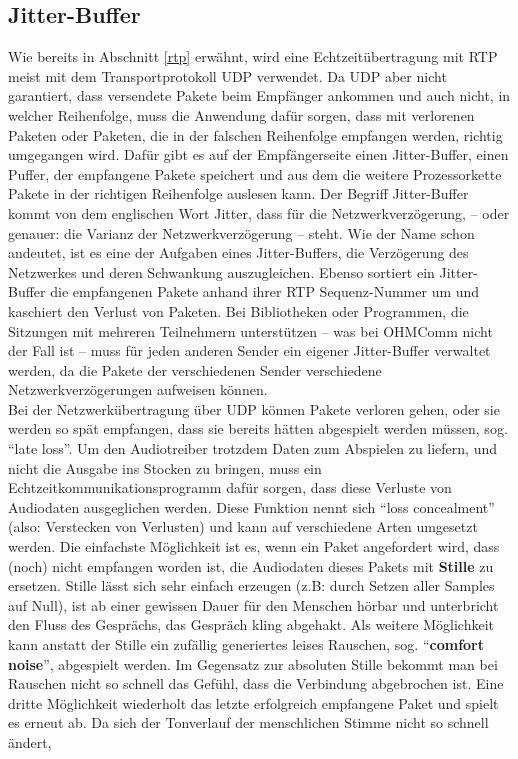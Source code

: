 \subsection{Jitter-Buffer}
\label{jitterBuffer}
Wie bereits in Abschnitt \ref{rtp} erwähnt, wird eine Echtzeitübertragung mit RTP meist mit dem Transportprotokoll UDP verwendet. Da UDP aber nicht garantiert, dass versendete Pakete beim Empfänger ankommen und auch nicht, in welcher Reihenfolge, muss die Anwendung dafür sorgen, dass mit verlorenen Paketen oder Paketen, die in der falschen Reihenfolge empfangen werden, richtig umgegangen wird. Dafür gibt es auf der Empfängerseite einen Jitter-Buffer, einen Puffer, der empfangene Pakete speichert und aus dem die weitere Prozessorkette Pakete in der richtigen Reihenfolge auslesen kann. Der Begriff Jitter-Buffer kommt von dem englischen Wort Jitter, dass für die Netzwerkverzögerung, -- oder genauer: die Varianz der Netzwerkverzögerung -- steht. Wie der Name schon andeutet, ist es eine der Aufgaben eines Jitter-Buffers, die Verzögerung des Netzwerkes und deren Schwankung auszugleichen. Ebenso sortiert ein Jitter-Buffer die empfangenen Pakete anhand ihrer RTP Sequenz-Nummer um und kaschiert den Verlust von Paketen. Bei Bibliotheken oder Programmen, die Sitzungen mit mehreren Teilnehmern unterstützen -- was bei OHMComm nicht der Fall ist -- muss für jeden anderen Sender ein eigener Jitter-Buffer verwaltet werden, da die Pakete der verschiedenen Sender verschiedene Netzwerkverzögerungen aufweisen können.
\\
Bei der Netzwerkübertragung über UDP können Pakete verloren gehen, oder sie werden so spät empfangen, dass sie bereits hätten abgespielt werden müssen, sog. \enquote{late loss}. Um den Audiotreiber trotzdem Daten zum Abspielen zu liefern, und nicht die Ausgabe ins Stocken zu bringen, muss ein Echtzeitkommunikationsprogramm dafür sorgen, dass diese Verluste von Audiodaten ausgeglichen werden. Diese Funktion nennt sich \enquote{loss concealment} (also: Verstecken von Verlusten) und kann auf verschiedene Arten umgesetzt werden. Die einfachste Möglichkeit ist es, wenn ein Paket angefordert wird, dass (noch) nicht empfangen worden ist, die Audiodaten dieses Pakets mit \textbf{Stille} zu ersetzen. Stille lässt sich sehr einfach erzeugen (z.B: durch Setzen aller Samples auf Null), ist ab einer gewissen Dauer für den Menschen hörbar und unterbricht den Fluss des Gesprächs, das Gespräch kling abgehakt. Als weitere Möglichkeit kann anstatt der Stille ein zufällig generiertes leises Rauschen, sog. \enquote{\textbf{comfort noise}}, abgespielt werden. Im Gegensatz zur absoluten Stille bekommt man bei Rauschen nicht so schnell das Gefühl, dass die Verbindung abgebrochen ist. Eine dritte Möglichkeit wiederholt das letzte erfolgreich empfangene Paket und spielt es erneut ab. Da sich der Tonverlauf der menschlichen Stimme nicht so schnell ändert, %
